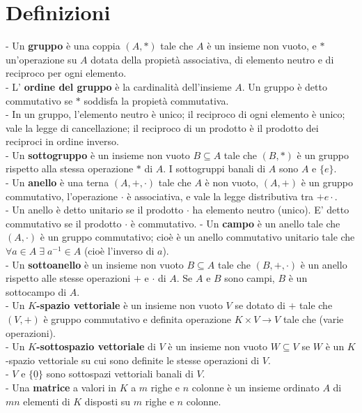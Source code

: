 \documentclass[a4paper,10pt]{article} %
\renewcommand{\b}[1]{%
    {\textbf{#1}}}
\renewcommand{\v}[1]{%
    {\underline{#1}}}
\begin{document}
\scriptsize

\section{Definizioni}
- Un \b{gruppo} è una coppia $(A, *)$ tale che $A$ è un insieme non vuoto, e $*$ un'operazione su $A$ dotata della propietà associativa, di elemento neutro e di reciproco per ogni elemento.\\
- L' \b{ordine del gruppo} è la cardinalità dell'insieme $A$. Un gruppo è detto commutativo se $*$ soddisfa la propietà commutativa.\\
- In un gruppo, l'elemento neutro è unico; il reciproco di ogni elemento è unico; vale la legge di cancellazione; il reciproco di un prodotto è il prodotto dei reciproci in ordine inverso.\\
- Un \b{sottogruppo} è un insieme non vuoto $B \subseteq A$ tale che $(B, *)$ è un gruppo rispetto alla stessa operazione $*$ di $A$. I sottogruppi banali di $A$ sono $A$ e $\{ e \}$.\\
- Un \b{anello} è una terna $(A, +, \cdot)$ tale che $A$ è non vuoto, $(A, +)$ è un gruppo commutativo, l'operazione $\cdot$ è associativa, e vale la legge distributiva tra $+ e \cdot$.\\
- Un anello è detto unitario se il prodotto $\cdot$ ha elemento neutro (unico). E' detto commutativo se il prodotto $\cdot$ è commutativo.
- Un \b{campo} è un anello tale che $(A, \cdot)$ è un gruppo commutativo; cioè è un anello commutativo unitario tale che $\forall a \in A \; \exists \; a^{-1} \in A$ (cioè l'inverso di $a$).\\
- Un \b{sottoanello} è un insieme non vuoto $B \subseteq A$ tale che $(B, +, \cdot)$ è un anello rispetto alle stesse operazioni $+$ e $\cdot$ di $A$. Se $A$ e $B$ sono campi, $B$ è un sottocampo di $A$.\\
- Un \b{$K$-spazio vettoriale} è un insieme non vuoto $V$ se dotato di $+$ tale che $(V, +)$ è gruppo commutativo e definita operazione $K \times V \rightarrow V$ tale che (varie operazioni).\\
- Un \b{$K$-sottospazio vettoriale} di $V$ è un insieme non vuoto $W \subseteq V$ se $W$ è un $K$-spazio vettoriale su cui sono definite le stesse operazioni di $V$.\\
- $V$ e $\{ \v{0} \}$ sono sottospazi vettoriali banali di $V$.\\
- Una \b{matrice} a valori in $K$ a $m$ righe e $n$ colonne è un insieme ordinato $A$ di $mn$ elementi di $K$ disposti su $m$ righe e $n$ colonne.\\
\end{document}
